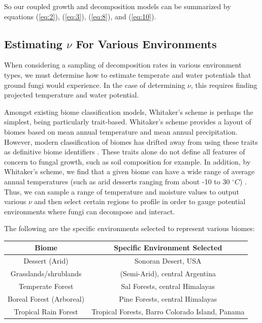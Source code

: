 \documentclass[12pt]{article}
\begin{document}
\begin{multicols}{2}
So our coupled growth and decomposition models can be summarized by equations (\ref{eq:2}), (\ref{eq:3}), (\ref{eq:8}), and (\ref{eq:10}).

\subsection{Estimating $\nu$ For Various Environments}

When considering a sampling of decomposition rates in various environment types, we must determine how to estimate temperate and water potentials that ground fungi would experience. In the case of determining $\nu$, this requires finding projected temperature and water potential.

Amongst existing biome classification models, Whitaker's scheme \cite{Whittaker1970} is perhaps the simplest, being particularly trait-based. Whitaker's scheme provides a layout of biomes based on mean annual temperature and mean annual precipitation. However, modern classification of biomes has drifted away from using these traits as definitive biome identifiers \cite{Mucina2018}. These traits alone do not define all features of concern to fungal growth, such as soil composition for example. In addition, by Whitaker's scheme, we find that a given biome can have a wide range of average annual temperatures (such as arid desserts ranging from about -10 to 30 $^{\circ}C$) \cite{Whittaker1970}. Thus, we can sample a range of temperature and moisture values to output various $\nu$ and then select certain regions to profile in order to gauge potential environments where fungi can decompose and interact.

The following are the specific environments selected to represent various biomes:

\end{multicols}

\begin{savenotes}
	\begin{table}[H]
		\begin{center}
			\begin{tabular}{|c c|} 
				\hline
				Biome & Specific Environment Selected \\ [0.5ex] 
				\hline\hline
				Dessert (Arid) & Sonoran Desert, USA \\ 
				\hline
				Grasslands/shrublands & (Semi-Arid), central Argentina\\
				\hline
				Temperate Forest & Sal Forests, central Himalayas\\
				\hline
				Boreal Forest (Arboreal) & Pine Forests, central Himalayas\\
				\hline
				Tropical Rain Forest & Tropical Forests, Barro Colorado Island, Panama \\
				\hline
			\end{tabular}
		\end{center}
	\end{table}
\end{savenotes}
\end{document}
